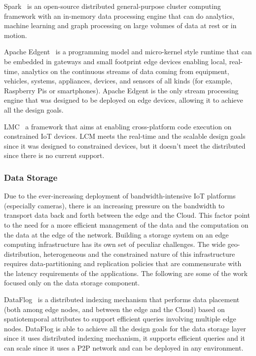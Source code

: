 Spark~\cite{spark} is an open-source distributed general-purpose cluster computing framework with an in-memory data processing engine that can do analytics, machine learning and graph processing on large volumes of data at rest or in motion.

Apache Edgent~\cite{edgent} is a programming model and micro-kernel style runtime that can be embedded in gateways and small footprint edge devices enabling local, real-time, analytics on the continuous streams of data coming from equipment, vehicles, systems, appliances, devices, and sensors of all kinds (for example, Raspberry Pis or smartphones). Apache Edgent is the only stream processing engine that was designed to be deployed on edge devices, allowing it to achieve all the design goals.

LMC~\cite{8102173} a framework that aims at enabling cross-platform code execution on constrained IoT devices. LCM meets the real-time and the scalable design goals since it was designed to constrained devices, but it doesn't meet the distributed since there is no current support.

\subsubsection{Data Storage}

Due to the ever-increasing deployment of bandwidth-intensive IoT platforms (especially cameras), there is an increasing pressure on the bandwidth to transport data back and forth between the edge and the Cloud. This factor point to the need for a more efficient management of the data and the computation on the data at the edge of the network. Building a storage system on an edge computing infrastructure has its own set of peculiar challenges. The wide geo-distribution, heterogeneous and the constrained nature of this
infrastructure requires data-partitioning and replication policies that are commensurate with the latency requirements of the applications. The following are some of the work focused only on the data storage component.

DataFlog~\cite{DataFog:2018} is a distributed indexing mechanism that performs data placement (both among edge nodes, and between the edge and the Cloud) based on spatiotemporal attributes to support efficient queries involving multiple edge nodes. DataFlog is able to achieve all the design goals for the data storage layer since it uses distributed indexing mechanism, it supports efficient queries and it can scale since it uses a P2P network and can be deployed in any environment.

